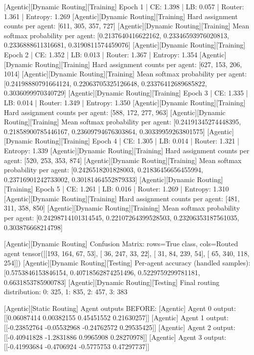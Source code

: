 [Agentic][Dynamic Routing][Training] Epoch 1 | CE: 1.398 | LB: 0.057 | Router: 1.361 | Entropy: 1.269
[Agentic][Dynamic Routing][Training] Hard assignment counts per agent: [611, 305, 357, 727]
[Agentic][Dynamic Routing][Training] Mean softmax probability per agent: [0.2137640416622162, 0.23346593976020813, 0.2336888611316681, 0.3190811574459076]
[Agentic][Dynamic Routing][Training] Epoch 2 | CE: 1.352 | LB: 0.013 | Router: 1.367 | Entropy: 1.354
[Agentic][Dynamic Routing][Training] Hard assignment counts per agent: [627, 153, 206, 1014]
[Agentic][Dynamic Routing][Training] Mean softmax probability per agent: [0.24198880791664124, 0.22063705325126648, 0.23376412689685822, 0.3036099970340729]
[Agentic][Dynamic Routing][Training] Epoch 3 | CE: 1.335 | LB: 0.014 | Router: 1.349 | Entropy: 1.350
[Agentic][Dynamic Routing][Training] Hard assignment counts per agent: [588, 172, 277, 963]
[Agentic][Dynamic Routing][Training] Mean softmax probability per agent: [0.24191345274448395, 0.21858900785446167, 0.23609794676303864, 0.30339959263801575]
[Agentic][Dynamic Routing][Training] Epoch 4 | CE: 1.305 | LB: 0.014 | Router: 1.321 | Entropy: 1.339
[Agentic][Dynamic Routing][Training] Hard assignment counts per agent: [520, 253, 353, 874]
[Agentic][Dynamic Routing][Training] Mean softmax probability per agent: [0.2426518201828003, 0.21836456656455994, 0.23716901242733002, 0.30181464552879333]
[Agentic][Dynamic Routing][Training] Epoch 5 | CE: 1.261 | LB: 0.016 | Router: 1.269 | Entropy: 1.310
[Agentic][Dynamic Routing][Training] Hard assignment counts per agent: [481, 311, 358, 850]
[Agentic][Dynamic Routing][Training] Mean softmax probability per agent: [0.24298714101314545, 0.22107264399528503, 0.23206353187561035, 0.303876668214798]

[Agentic][Dynamic Routing] Confusion Matrix: rows=True class, cols=Routed agent
tensor([[193, 164,  67,  53],
[ 36, 247,  33,  22],
[ 31,  84, 239,  54],
[ 65, 340, 118, 254]])
[Agentic][Dynamic Routing][Testing] Per-agent accuracy (handled samples): [0.5753846153846154, 0.40718562874251496, 0.5229759299781181, 0.6631853785900783]
[Agentic][Dynamic Routing][Testing] Final routing distribution: {0: 325, 1: 835, 2: 457, 3: 383}

[Agentic][Static Routing] Agent outputs BEFORE:
[Agentic] Agent 0 output: [[0.06087414 0.00382155 0.45451552 0.21630257]]
[Agentic] Agent 1 output: [[-0.23852764 -0.05532968 -0.24762572  0.29535425]]
[Agentic] Agent 2 output: [[-0.40941828 -1.2831886   0.9965908   0.28270978]]
[Agentic] Agent 3 output: [[-0.41993684 -0.4706924  -0.5775753   0.47297737]]

